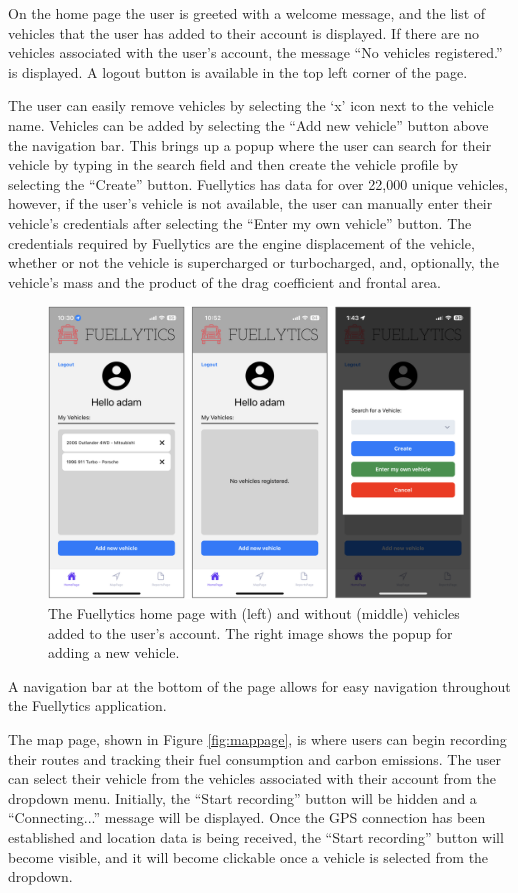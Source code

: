 \documentclass[11pt, oneside]{article}
\begin{document}
On the home page the user is greeted with a welcome message, and the list of vehicles that the user has added to their account is displayed.  If there are no vehicles associated with the user's account, the message ``No vehicles registered.'' is displayed.  A logout button is available in the top left corner of the page.

The user can easily remove vehicles by selecting the `x' icon next to the vehicle name. Vehicles can be added by selecting the ``Add new vehicle'' button above the navigation bar.  This brings up a popup where the user can search for their vehicle by typing in the search field and then create the vehicle profile by selecting the ``Create'' button.  Fuellytics has data for over 22,000 unique vehicles, however, if the user's vehicle is not available, the user can manually enter their vehicle's credentials after selecting the ``Enter my own vehicle'' button.  The credentials required by Fuellytics are the engine displacement of the vehicle, whether or not the vehicle is supercharged or turbocharged, and, optionally, the vehicle's mass and the product of the drag coefficient and frontal area.
\begin{figure}[H]
\centerline{\includegraphics[width=16.5cm]{img/homepage.png}}
\caption{\label{fig:homepage} The Fuellytics home page with (left) and without (middle) vehicles added to the user's account. The right image shows the popup for adding a new vehicle.}
\end{figure}

A navigation bar at the bottom of the page allows for easy navigation throughout the Fuellytics application.

The map page, shown in Figure \ref*{fig:mappage}, is where users can begin recording their routes and tracking their fuel consumption and carbon emissions.  The user can select their vehicle from the vehicles associated with their account from the dropdown menu.  Initially, the ``Start recording'' button will be hidden and a ``Connecting...'' message will be displayed.  Once the GPS connection has been established and location data is being received, the ``Start recording'' button will become visible, and it will become clickable once a vehicle is selected from the dropdown.
\end{document}

